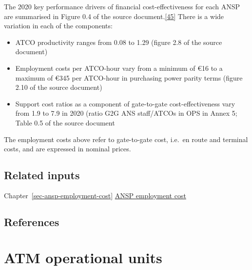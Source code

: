 \documentclass[
  11pt,
  a4paper,
]{book}
\begin{document}
The 2020 key performance drivers of financial cost-effectiveness for
each ANSP are summarised in Figure 0.4 of the source
document.\protect\hyperlink{ref-ace2020}{{[}45{]}} There is a wide
variation in each of the components:

\begin{itemize}
\item
  ATCO productivity ranges from 0.08 to 1.29 (figure 2.8 of the source
  document)
\item
  Employment costs per ATCO-hour vary from a minimum of €16 to a maximum
  of €345 per ATCO-hour in purchasing power parity terms (figure 2.10 of
  the source document)
\item
  Support cost ratios as a component of gate-to-gate cost-effectiveness
  vary from 1.9 to 7.9 in 2020 (ratio G2G ANS staff/ATCOs in OPS in
  Annex 5; Table 0.5 of the source document
\end{itemize}

\begin{tcolorbox}[enhanced jigsaw, opacityback=0, arc=.35mm, colframe=quarto-callout-note-color-frame, breakable, left=2mm, leftrule=.75mm, titlerule=0mm, colbacktitle=quarto-callout-note-color!10!white, rightrule=.15mm, opacitybacktitle=0.6, bottomtitle=1mm, colback=white, toptitle=1mm, title=\textcolor{quarto-callout-note-color}{\faInfo}\hspace{0.5em}{Note}, bottomrule=.15mm, toprule=.15mm, coltitle=black]

The employment costs above refer to gate-to-gate cost, i.e.~en route and
terminal costs, and are expressed in nominal prices.

\end{tcolorbox}

\hypertarget{related-inputs-23}{%
\section{Related inputs}\label{related-inputs-23}}

Chapter~\ref{sec-ansp-employment-cost}
\protect\hyperlink{sec-ansp-employment-cost}{ANSP employment cost}

\hypertarget{references-28}{%
\section{References}\label{references-28}}

\hypertarget{sec-atm-operational-units}{%
\chapter{ATM operational units}\label{sec-atm-operational-units}}
\end{document}
